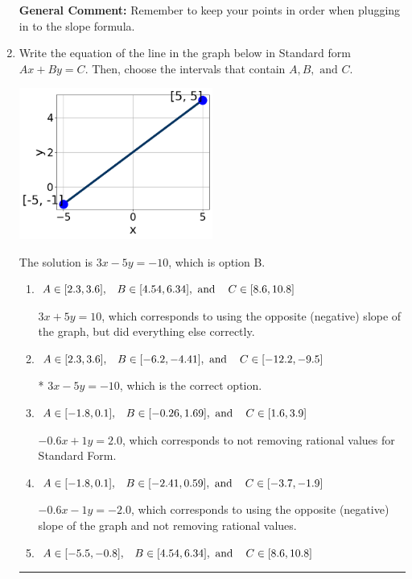 \documentclass{extbook}[14pt]
\newcommand{\litem}[1]{\item #1

\rule{\textwidth}{0.4pt}}
\begin{document}
\begin{enumerate}
{\textbf{General Comment:} Remember to keep your points in order when plugging in to the slope formula.
}
\litem{
Write the equation of the line in the graph below in Standard form $Ax+By=C$. Then, choose the intervals that contain $A, B, \text{ and } C$.

\begin{center}
    \includegraphics[width=0.5\textwidth]{../Figures/linearGraphToStandardCopyB.png}
\end{center}




The solution is \( 3x - 5y = -10 \), which is option B.\begin{enumerate}[label=\Alph*.]
\item \( A \in [2.3, 3.6], \hspace{3mm} B \in [4.54, 6.34], \text{ and } \hspace{3mm} C \in [8.6, 10.8] \)

 $3x + 5y = 10$, which corresponds to using the opposite (negative) slope of the graph, but did everything else correctly.
\item \( A \in [2.3, 3.6], \hspace{3mm} B \in [-6.2, -4.41], \text{ and } \hspace{3mm} C \in [-12.2, -9.5] \)

* $3x - 5y = -10$, which is the correct option.
\item \( A \in [-1.8, 0.1], \hspace{3mm} B \in [-0.26, 1.69], \text{ and } \hspace{3mm} C \in [1.6, 3.9] \)

 $-0.6x + 1y = 2.0$, which corresponds to not removing rational values for Standard Form.
\item \( A \in [-1.8, 0.1], \hspace{3mm} B \in [-2.41, 0.59], \text{ and } \hspace{3mm} C \in [-3.7, -1.9] \)

 $-0.6x - 1y = -2.0$, which corresponds to using the opposite (negative) slope of the graph and not removing rational values.
\item \( A \in [-5.5, -0.8], \hspace{3mm} B \in [4.54, 6.34], \text{ and } \hspace{3mm} C \in [8.6, 10.8] \)


\end{enumerate}}
\end{enumerate}
\end{document}
